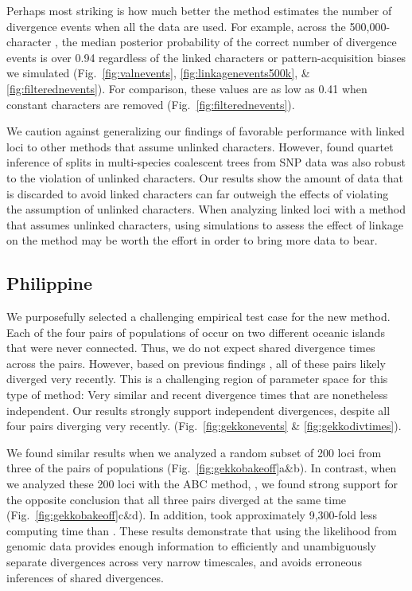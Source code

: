 Perhaps most striking is how much better the method estimates the number
of divergence events when all the data are used.
For example, across the 500,000-character \datasets, the
median posterior probability of the correct number of divergence events
is over 0.94 regardless of the linked characters
or pattern-acquisition biases we simulated
(Fig.\ 
\ref{fig:valnevents},
\ref{fig:linkagenevents500k},
\&
\ref{fig:filterednevents}).
For comparison,
these values are as low as 0.41 when constant characters are removed
(Fig.~\ref{fig:filterednevents}).

We caution against generalizing our findings
of favorable performance with linked loci
to other methods that assume unlinked characters.
However, 
\citet{ChifmanKubatko2014}
found quartet inference of splits in multi-species coalescent trees
from SNP data was also robust to the violation of unlinked characters.
Our results show the amount of data that is discarded to avoid linked
characters can far outweigh the effects of violating the assumption of
unlinked characters.
When analyzing linked loci with a method that assumes unlinked characters,
using simulations to assess the effect of linkage on the method may be worth
the effort in order to bring more data to bear.


\subsection{Philippine }
We purposefully selected a challenging empirical test case for the new method.
Each of the four pairs of populations of \spp{Gekko} occur on two different
oceanic islands that were never connected.
Thus, we do not expect shared divergence times across the pairs.
However, based on previous findings \citep{Siler2012, Siler2014kikuchii}, all
of these pairs likely diverged very recently.
This is a challenging region of parameter space for this type of method: Very
similar and recent divergence times that are nonetheless independent.
Our results strongly support independent divergences, despite all four pairs
diverging very recently.
(Fig.\ 
\ref{fig:gekkonevents}
\& 
\ref{fig:gekkodivtimes}).

We found similar results when we analyzed a random subset of 200 loci from
three of the pairs of  populations
(Fig.~\ref{fig:gekkobakeoff}a\&b).
In contrast, when we analyzed these 200 loci with the ABC method, \dppmsbayes,
we found strong support for the opposite conclusion that all three pairs
diverged at the same time
(Fig.~\ref{fig:gekkobakeoff}c\&d).
In addition, \ecoevolity took approximately 9,300-fold less computing time than
\dppmsbayes.
These results demonstrate that using the likelihood from genomic data provides
enough information to efficiently and unambiguously separate divergences across
very narrow timescales, and avoids erroneous inferences of shared divergences.

